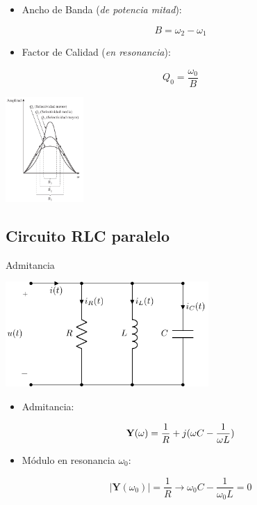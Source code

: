 \begin{itemize}
\item Ancho de Banda (\emph{de potencia mitad}):
\end{itemize}
\[
  B = \omega_2 - \omega_1
\]

\begin{itemize}
\item Factor de Calidad (\emph{en resonancia}):
\end{itemize}
\[
  \boxed{Q_0 = \frac{\omega_0}{B}}
\]


\begin{center}
\includegraphics[height=4cm]{../figs/Q_B.pdf}
\end{center}
\subsection{Circuito RLC paralelo}
\label{sec:orgab7f8ca}


{Admitancia}

\begin{center}
\includegraphics[height=4cm]{../figs/RLC_paralelo_resonante.pdf}
\end{center}

\begin{itemize}
\item Admitancia:
\end{itemize}
\[
  \mathbf{Y}(\omega) = \frac{1}{R} + j(\omega C - \frac{1}{\omega L})
\]
\begin{itemize}
\item Módulo en resonancia \(\omega_0\):
\end{itemize}
\[
  |\mathbf{Y}(\omega_0)| = \frac{1}{R} \rightarrow \omega_0 C - \frac{1}{\omega_0 L} = 0
\]


